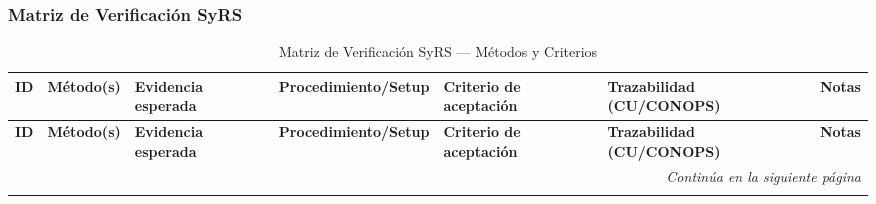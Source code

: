 \begin{landscape}
\scriptsize
\renewcommand{\arraystretch}{1.2}
\setlength{\tabcolsep}{3pt}

\subsubsection{Matriz de Verificación SyRS}
\begin{longtable}{|p{1.8cm}|p{1.4cm}|p{4.2cm}|p{4.8cm}|p{4.2cm}|p{3.2cm}|p{2.2cm}|}
\caption{Matriz de Verificación SyRS — Métodos y Criterios}\label{tab:v_matrix_syrs}\\
\hline
\rowcolor{AgencyBlue!15}
\textbf{ID} & \textbf{Método(s)} & \textbf{Evidencia esperada} & \textbf{Procedimiento/Setup} & \textbf{Criterio de aceptación} & \textbf{Trazabilidad (CU/CONOPS)} & \textbf{Notas}\\
\hline
\endfirsthead

\hline
\rowcolor{AgencyBlue!15}
\textbf{ID} & \textbf{Método(s)} & \textbf{Evidencia esperada} & \textbf{Procedimiento/Setup} & \textbf{Criterio de aceptación} & \textbf{Trazabilidad (CU/CONOPS)} & \textbf{Notas}\\
\hline
\endhead

\hline
\multicolumn{7}{r}{\textit{Continúa en la siguiente página}}\\
\endfoot

\hline
\rowcolor{AgencyBlue!15}
\endlastfoot


\end{longtable}
\end{landscape}
